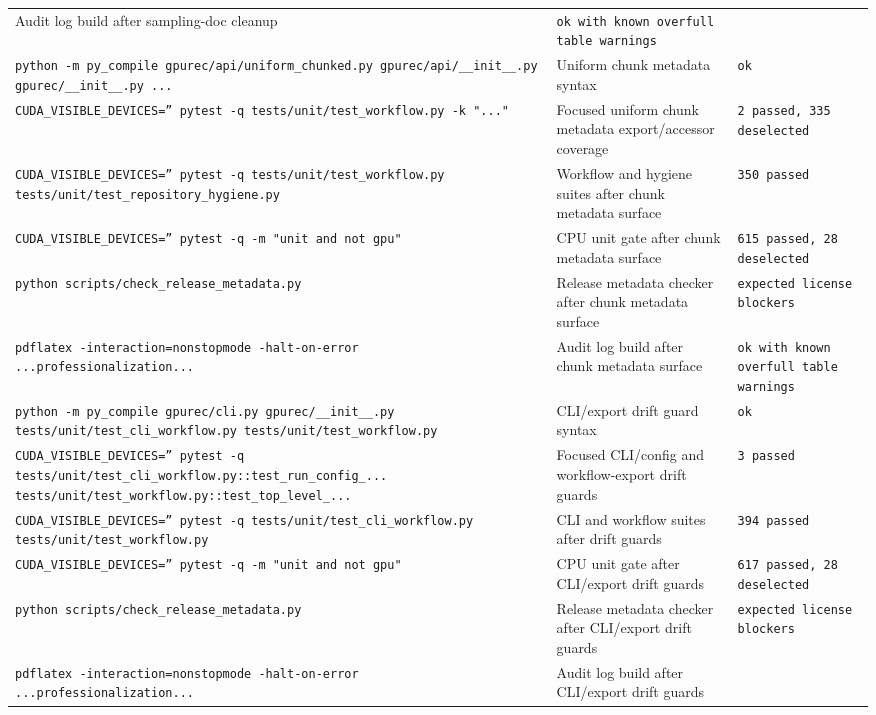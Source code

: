 \documentclass[11pt]{article}
\begin{document}
\begin{center}
\begin{tabular}{lll}
Audit log build after sampling-doc cleanup &
\texttt{ok with known overfull table warnings} \\
\texttt{python -m py\_compile gpurec/api/uniform\_chunked.py gpurec/api/\_\_init\_\_.py gpurec/\_\_init\_\_.py ...} &
Uniform chunk metadata syntax &
\texttt{ok} \\
\texttt{CUDA\_VISIBLE\_DEVICES='' pytest -q tests/unit/test\_workflow.py -k "..."} &
Focused uniform chunk metadata export/accessor coverage &
\texttt{2 passed, 335 deselected} \\
\texttt{CUDA\_VISIBLE\_DEVICES='' pytest -q tests/unit/test\_workflow.py tests/unit/test\_repository\_hygiene.py} &
Workflow and hygiene suites after chunk metadata surface &
\texttt{350 passed} \\
\texttt{CUDA\_VISIBLE\_DEVICES='' pytest -q -m "unit and not gpu"} &
CPU unit gate after chunk metadata surface &
\texttt{615 passed, 28 deselected} \\
\texttt{python scripts/check\_release\_metadata.py} &
Release metadata checker after chunk metadata surface &
\texttt{expected license blockers} \\
\texttt{pdflatex -interaction=nonstopmode -halt-on-error ...professionalization...} &
Audit log build after chunk metadata surface &
\texttt{ok with known overfull table warnings} \\
\texttt{python -m py\_compile gpurec/cli.py gpurec/\_\_init\_\_.py tests/unit/test\_cli\_workflow.py tests/unit/test\_workflow.py} &
CLI/export drift guard syntax &
\texttt{ok} \\
\texttt{CUDA\_VISIBLE\_DEVICES='' pytest -q tests/unit/test\_cli\_workflow.py::test\_run\_config\_... tests/unit/test\_workflow.py::test\_top\_level\_...} &
Focused CLI/config and workflow-export drift guards &
\texttt{3 passed} \\
\texttt{CUDA\_VISIBLE\_DEVICES='' pytest -q tests/unit/test\_cli\_workflow.py tests/unit/test\_workflow.py} &
CLI and workflow suites after drift guards &
\texttt{394 passed} \\
\texttt{CUDA\_VISIBLE\_DEVICES='' pytest -q -m "unit and not gpu"} &
CPU unit gate after CLI/export drift guards &
\texttt{617 passed, 28 deselected} \\
\texttt{python scripts/check\_release\_metadata.py} &
Release metadata checker after CLI/export drift guards &
\texttt{expected license blockers} \\
\texttt{pdflatex -interaction=nonstopmode -halt-on-error ...professionalization...} &
Audit log build after CLI/export drift guards &

\end{tabular}
\end{center}
\end{document}

